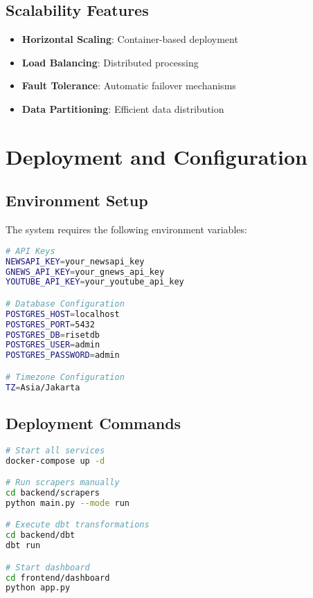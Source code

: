 \documentclass[12pt,a4paper]{article}
\begin{document}
\subsection{Scalability Features}
\begin{itemize}
    \item \textbf{Horizontal Scaling}: Container-based deployment
    \item \textbf{Load Balancing}: Distributed processing
    \item \textbf{Fault Tolerance}: Automatic failover mechanisms
    \item \textbf{Data Partitioning}: Efficient data distribution
\end{itemize}

\section{Deployment and Configuration}

\subsection{Environment Setup}
The system requires the following environment variables:

\begin{lstlisting}[language=bash, caption=Environment Configuration]
# API Keys
NEWSAPI_KEY=your_newsapi_key
GNEWS_API_KEY=your_gnews_api_key
YOUTUBE_API_KEY=your_youtube_api_key

# Database Configuration
POSTGRES_HOST=localhost
POSTGRES_PORT=5432
POSTGRES_DB=risetdb
POSTGRES_USER=admin
POSTGRES_PASSWORD=admin

# Timezone Configuration
TZ=Asia/Jakarta
\end{lstlisting}

\subsection{Deployment Commands}
\begin{lstlisting}[language=bash, caption=Deployment Instructions]
# Start all services
docker-compose up -d

# Run scrapers manually
cd backend/scrapers
python main.py --mode run

# Execute dbt transformations
cd backend/dbt
dbt run

# Start dashboard
cd frontend/dashboard
python app.py
\end{lstlisting}
\end{document}
